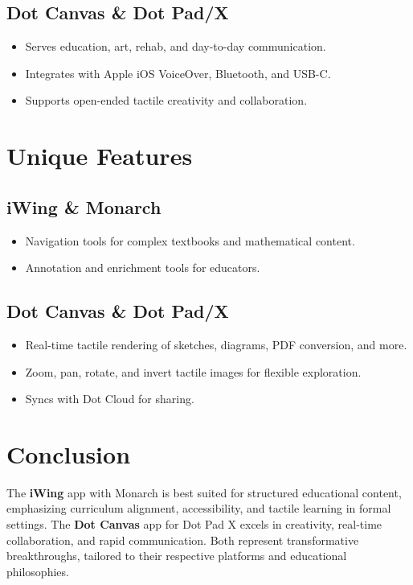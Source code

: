 \subsection{Dot Canvas \& Dot Pad/X}
\begin{itemize}
	\item Serves education, art, rehab, and day-to-day communication.
	\item Integrates with Apple iOS VoiceOver, Bluetooth, and USB-C\supercite{visionaid_dotpad}\supercite{rnib_dotpad}.
	\item Supports open-ended tactile creativity and collaboration.
\end{itemize}

\section{Unique Features}

\subsection{iWing \& Monarch}
\begin{itemize}
	\item Navigation tools for complex textbooks and mathematical content\supercite{floridareading_monarch}.
	\item Annotation and enrichment tools for educators.
\end{itemize}

\subsection{Dot Canvas \& Dot Pad/X}
\begin{itemize}
	\item Real-time tactile rendering of sketches, diagrams, PDF conversion, and more\supercite{ces_dotcanvas}.
	\item Zoom, pan, rotate, and invert tactile images for flexible exploration.
	\item Syncs with Dot Cloud for sharing.
\end{itemize}

\section{Conclusion}

The \textbf{iWing} app with Monarch is best suited for structured educational content, emphasizing curriculum alignment, accessibility, and tactile learning in formal settings. The \textbf{Dot Canvas} app for Dot Pad X excels in creativity, real-time collaboration, and rapid communication. Both represent transformative breakthroughs, tailored to their respective platforms and educational philosophies.
